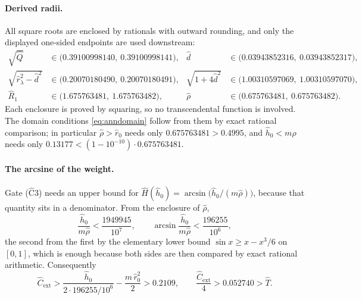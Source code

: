 \documentclass[11pt]{article}
\theoremstyle{plain}
\theoremstyle{definition}
\theoremstyle{remark}
\begin{document}
\paragraph{Derived radii.} All square roots are enclosed by rationals with
outward rounding, and only the displayed one-sided endpoints are used
downstream:
\begin{align*}
  \sqrt{\hat Q}&\in\bigl(0.39100998140,\ 0.39100998141\bigr), &
  \hat d&\in\bigl(0.03943852316,\ 0.03943852317\bigr),\\
  \sqrt{\hat r_{\lambda}^{2}-\hat d^{2}}
    &\in\bigl(0.20070180490,\ 0.20070180491\bigr), &
  \sqrt{1+4\hat d^{2}}&\in\bigl(1.00310597069,\ 1.00310597070\bigr),\\
  \hat R_{1}&\in\bigl(1.675763481,\ 1.675763482\bigr), &
  \hat\rho&\in\bigl(0.675763481,\ 0.675763482\bigr).
\end{align*}
Each enclosure is proved by squaring, so no transcendental function is
involved. The domain conditions \eqref{eq:anndomain} follow from them by exact
rational comparison; in particular $\hat\rho>\hat r_{0}$ needs only
$0.675763481>0.4995$, and $\hat h_{0}<m\hat\rho$ needs only
$0.13177<(1-10^{-10})\cdot0.675763481$.

\paragraph{The arcsine of the weight.} Gate ($\widehat{\mathrm{C}}3$) needs an
upper bound for $\hat H(\hat h_{0})=\arcsin\bigl(\hat h_{0}/(m\hat\rho)\bigr)$,
because that quantity sits in a denominator. From the enclosure of $\hat\rho$,
\[
  \frac{\hat h_{0}}{m\hat\rho}<\frac{1949945}{10^{7}},
  \qquad
  \arcsin\frac{\hat h_{0}}{m\hat\rho}<\frac{196255}{10^{6}},
\]
the second from the first by the elementary lower bound
$\sin x\ge x-x^{3}/6$ on $[0,1]$, which is enough because both sides are then
compared by exact rational arithmetic. Consequently
\[
  \hat C_{\mathrm{ext}}
  >\frac{\hat h_{0}}{2\cdot196255/10^{6}}-\frac{m\,\hat r_{0}^{2}}{2}
  >0.2109,
  \qquad
  \frac{\hat C_{\mathrm{ext}}}{4}>0.052740>\hat T .
\]
\end{document}
